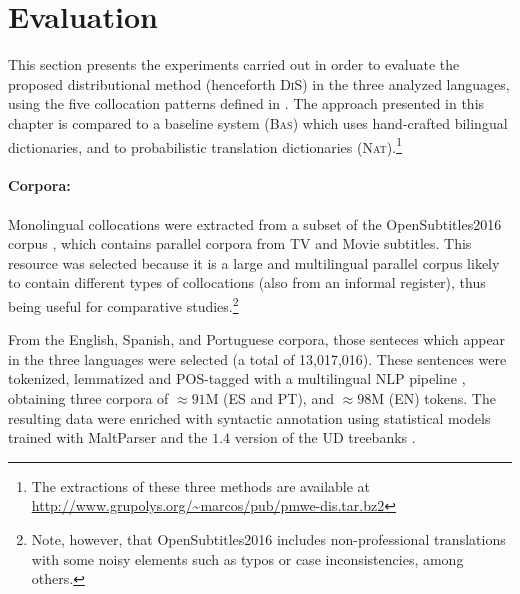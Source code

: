 \documentclass[output=paper
,modfonts
,nonflat]{langsci/langscibook}
\begin{document}
%
\section{Evaluation}
\label{garcia:sec:experiments}
This section presents the experiments carried out in order to evaluate the proposed distributional
method (henceforth \textsc{DiS}) in the three analyzed languages, using the five collocation
patterns defined in . The approach presented in this chapter is
compared to a baseline system (\textsc{Bas}) which uses hand-crafted bilingual dictionaries,
and to probabilistic translation dictionaries (\textsc{Nat}).\footnote{The extractions
  of these three methods are available at\\\scriptsize{\url{http://www.grupolys.org/~marcos/pub/pmwe-dis.tar.bz2}}}

\paragraph*{Corpora:} Monolingual collocations were extracted from a subset of the
OpenSubtitles2016 corpus \citep{opus}, which contains parallel corpora from TV and Movie
subtitles. This resource was selected because it is a large and multilingual parallel corpus
likely to contain different types of collocations (also from an informal register),
thus being useful for comparative studies.\footnote{Note, however, that
  OpenSubtitles2016 includes non-professional translations with some noisy elements such as typos
  or case inconsistencies, among others.}

From the English, Spanish, and Portuguese corpora, those senteces which appear in the three
languages were selected (a total of 13,017,016). These sentences were tokenized, lemmatized
and POS-tagged with a multilingual NLP pipeline \citep{Citius}, obtaining three corpora of
$\approx91$M (ES and PT), and $\approx98$M (EN) tokens. The resulting data
were enriched with syntactic annotation using statistical models trained with MaltParser \citep{MaltParser}
and the $1.4$ version of the UD treebanks \citep{univdep}.
\end{document}
